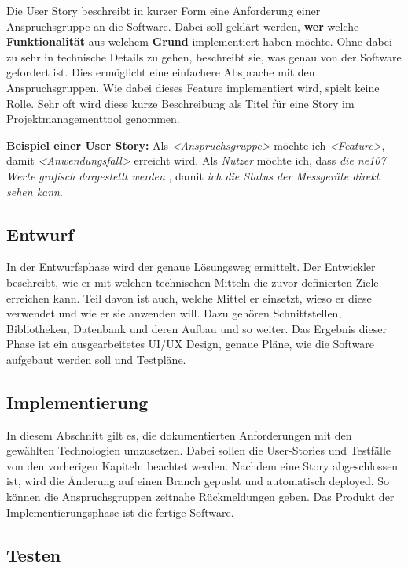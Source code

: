 Die User Story beschreibt in kurzer Form eine Anforderung einer Anspruchsgruppe an die Software. Dabei soll geklärt werden, \textbf{wer} welche \textbf{Funktionalität} aus welchem \textbf{Grund} implementiert haben möchte. Ohne dabei zu sehr in technische Details zu gehen, beschreibt sie, was genau von der Software gefordert ist. Dies ermöglicht eine einfachere Absprache mit den Anspruchsgruppen. Wie dabei dieses Feature implementiert wird, spielt keine Rolle. Sehr oft wird diese kurze Beschreibung als Titel für eine Story im Projektmanagementtool genommen.

\textbf{Beispiel einer User Story:}
\newline
Als \textit{<Anspruchsgruppe>} möchte ich \textit{<Feature>}, damit \textit{<Anwendungsfall>} erreicht wird.
\linebreak
\linebreak
Als \textit{Nutzer} möchte ich, dass \textit{die ne107 Werte grafisch dargestellt werden} , damit \textit{ich die Status der Messgeräte direkt sehen kann}.

\subsection{Entwurf}

In der Entwurfsphase wird der genaue Lösungsweg ermittelt. Der Entwickler beschreibt, wie er mit welchen technischen Mitteln die zuvor definierten Ziele erreichen kann. Teil davon ist auch, welche Mittel er einsetzt, wieso er diese verwendet und wie er sie anwenden will. Dazu gehören Schnittstellen, Bibliotheken, Datenbank und deren Aufbau und so weiter. Das Ergebnis dieser Phase ist ein ausgearbeitetes UI/UX Design, genaue Pläne, wie die Software aufgebaut werden soll und Testpläne.

\subsection{Implementierung}

In diesem Abschnitt gilt es, die dokumentierten Anforderungen mit den gewählten Technologien umzusetzen. Dabei sollen die User-Stories und Testfälle von den vorherigen Kapiteln beachtet werden.
\newline
Nachdem eine Story abgeschlossen ist, wird die Änderung auf einen Branch gepusht und automatisch deployed. So können die Anspruchsgruppen zeitnahe Rückmeldungen geben. Das Produkt der Implementierungsphase ist die fertige Software.


\subsection{Testen}


